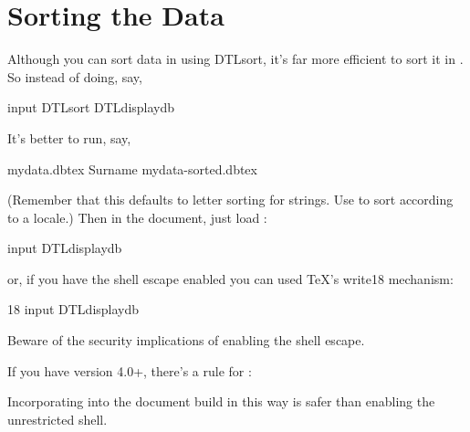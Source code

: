 \section{Sorting the Data}\label{sec:sort}

Although you can sort data in  using \gls{DTLsort}, 
it's far more efficient to sort it in . So instead of doing, say,
\begin{codebox}
\gls{input}
\gls{DTLsort}
\gls{DTLdisplaydb}
\end{codebox}
It's better to run, say,
\begin{terminal}
  mydata.dbtex  Surname  mydata-sorted.dbtex
\end{terminal}
(Remember that this defaults to letter sorting for strings. Use
 to sort according to a locale.)
Then in the document, just load :
\begin{codebox}
\gls{input}
\gls{DTLdisplaydb}
\end{codebox}
or, if you have the shell escape enabled you can used \TeX's 
\gls{write18} mechanism:
\begin{codebox}
18
\codepar
\gls{input}
\gls{DTLdisplaydb}
\end{codebox}

\begin{important}
Beware of the security implications of enabling the shell escape.
\end{important}

If you have  version 4.0+, there's a rule for :
\begin{codebox}
\end{codebox}
Incorporating  into the document build in this way
is safer than enabling the unrestricted shell.

